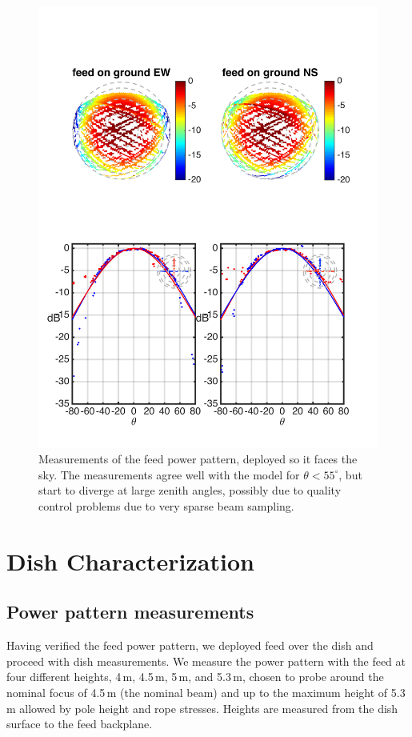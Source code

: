 \documentclass{emulateapj}
\begin{document}
\begin{figure}[h]
\includegraphics[width=6.5in]{feed0_abs_old_ref_model.png}
\caption{Measurements of the feed power pattern, deployed so it faces the sky. The measurements agree well with the model for $\theta<55^\circ$, but start to diverge at large zenith angles, possibly due to quality control problems due to very sparse beam sampling.}
\label{fig:feed0}
\end{figure}

\section{Dish Characterization}

\subsection{Power pattern measurements}

Having verified the feed power pattern, we deployed feed over the dish and proceed with dish measurements. We measure the power pattern with the feed at four different heights, 4\,m, 4.5\,m, 5\,m, and 5.3\,m, chosen to probe around the nominal focus of 4.5\,m (the nominal beam) and up to the maximum height of 5.3\,m allowed by pole height and rope stresses. Heights are measured from the dish surface to the feed backplane. 
\end{document}
